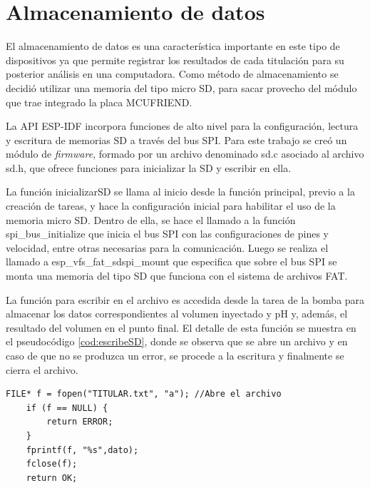 \section{Almacenamiento de datos}

El almacenamiento de datos es una característica importante en este tipo de dispositivos ya que permite registrar los resultados de cada titulación para su posterior análisis en una computadora. Como método de almacenamiento se decidió utilizar una memoria del tipo micro SD, para sacar provecho del módulo que trae integrado la placa MCUFRIEND.

La API ESP-IDF incorpora funciones de alto nivel para la configuración, lectura y escritura de memorias SD a través del bus SPI. Para este trabajo se creó un módulo de \textit{firmware}, formado por un archivo denominado sd.c asociado al archivo sd.h, que ofrece funciones para inicializar la SD y escribir en ella.

La función inicializarSD se llama al inicio desde la función principal, previo a la creación de tareas, y hace la configuración inicial para habilitar el uso de la memoria micro SD. Dentro de ella, se hace el llamado a  la función spi\_bus\_initialize que inicia el bus SPI con las configuraciones de pines y velocidad, entre otras necesarias para la comunicación. Luego se realiza el llamado a esp\_vfs\_fat\_sdspi\_mount que especifica que sobre el bus SPI se monta una memoria del tipo SD que funciona con el sistema de archivos FAT.

La función para escribir en el archivo es accedida desde la tarea de la bomba para almacenar los datos correspondientes al volumen inyectado y pH y, además, el resultado del volumen en el punto final. El detalle de esta función se muestra en el pseudocódigo \ref{cod:escribeSD}, donde se observa que se abre un archivo y en caso de que no se produzca un error, se procede a la escritura y finalmente se cierra el archivo.

\begin{lstlisting}[label=cod:escribeSD,caption=Pseudocódigo de la función que escribe en la memoria SD.]
    FILE* f = fopen("TITULAR.txt", "a"); //Abre el archivo
    if (f == NULL) {
        return ERROR;
    }
    fprintf(f, "%s",dato);
    fclose(f);
    return OK;
\end{lstlisting}



